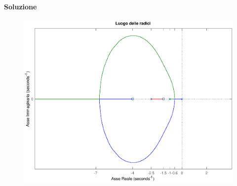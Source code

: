 \paragraph{Soluzione}

\begin{figure}[ht]
	\centering
	\includegraphics[scale=.6]{mod1/assets/rl_ex34}
\end{figure}

